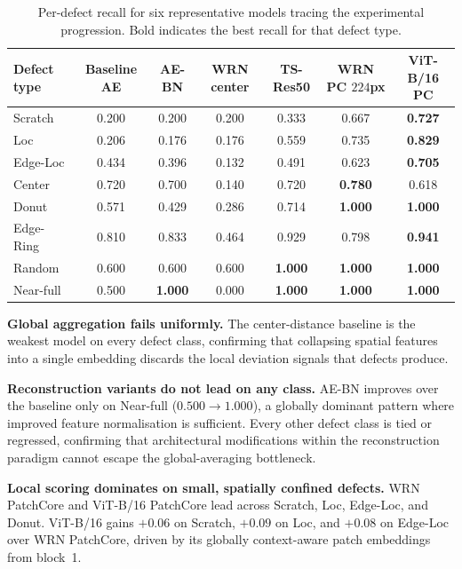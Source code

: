 \documentclass[11pt]{article}
\begin{document}
\begin{table}[H]
\centering
\caption{Per-defect recall for six representative models tracing the experimental
progression. Bold indicates the best recall for that defect type.}
\label{tab:per_defect}
\begin{tabular}{lcccccc}
\toprule
Defect type
  & Baseline AE
  & AE-BN
  & WRN center
  & TS-Res50
  & WRN PC $224$px
  & ViT-B/16 PC \\
\midrule
Scratch   & 0.200 & 0.200 & 0.200 & 0.333 & 0.667 & \textbf{0.727} \\
Loc       & 0.206 & 0.176 & 0.176 & 0.559 & 0.735 & \textbf{0.829} \\
Edge-Loc  & 0.434 & 0.396 & 0.132 & 0.491 & 0.623 & \textbf{0.705} \\
Center    & 0.720 & 0.700 & 0.140 & 0.720 & \textbf{0.780} & 0.618 \\
Donut     & 0.571 & 0.429 & 0.286 & 0.714 & \textbf{1.000} & \textbf{1.000} \\
Edge-Ring & 0.810 & 0.833 & 0.464 & 0.929 & 0.798 & \textbf{0.941} \\
Random    & 0.600 & 0.600 & 0.600 & \textbf{1.000} & \textbf{1.000} & \textbf{1.000} \\
Near-full & 0.500 & \textbf{1.000} & 0.000 & \textbf{1.000} & \textbf{1.000} & \textbf{1.000} \\
\bottomrule
\end{tabular}
\end{table}

\textbf{Global aggregation fails uniformly.} The center-distance baseline is the weakest model on every defect class, confirming that collapsing spatial features into a single embedding discards the local deviation signals that defects produce.

\textbf{Reconstruction variants do not lead on any class.} AE-BN improves over the baseline only on Near-full ($0.500 \to 1.000$), a globally dominant pattern where improved feature normalisation is sufficient. Every other defect class is tied or regressed, confirming that architectural modifications within the reconstruction paradigm cannot escape the global-averaging bottleneck.

\textbf{Local scoring dominates on small, spatially confined defects.} WRN PatchCore and ViT-B/16 PatchCore lead across Scratch, Loc, Edge-Loc, and Donut. ViT-B/16 gains $+0.06$ on Scratch, $+0.09$ on Loc, and $+0.08$ on Edge-Loc over WRN PatchCore, driven by its globally context-aware patch embeddings from block~1.
\end{document}
